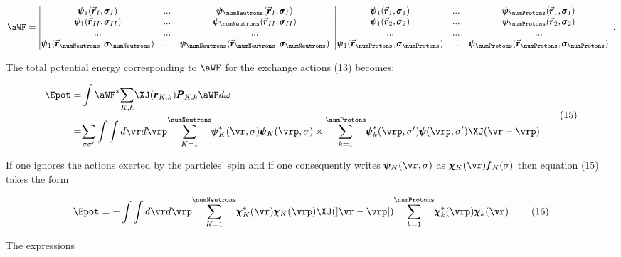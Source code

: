 \documentclass{article}
\newcommand{\var}[1]{\pmb{#1}}
\newcommand{\const}[1]{#1}
\newcommand{\nc}[2]{
  \newcommand{#1}{#2}
}
\newcommand{\rc}[2]{
  \renewcommand{#1}{#2}
}
\newcommand{\comp}[1]{{#1}}
\newcommand{\vect}[1]{\vec{\var{#1}}}
\newcommand{\primed}[1]{{#1^{\prime}}}
\newcommand{\isoX}[1]{\var{\rho}^\comp{#1}}
\newcommand{\vrX}[1]{\vect{r}_{\comp{#1}}}
\newcommand{\spinX}[1]{\var{\sigma}_{\comp{#1}}}
\newcommand{\WF}{\var{\psi}}
\newcommand{\WFxy}[2]{
  \WF_{\comp{#1}}(\vrX{#2}, \spinX{#2})
}
\newcommand{\ser}[2]{\underset{#1}{\sum} #2 }
\newcommand{\serXY}[3]{\underset{#1}{\overset{#2}{\sum}} #3}
\newcommand{\nequ}[2]{
\begin{equation*}
#1
\tag{#2}
\end{equation*}
}
\newcommand{\uequ}[1]{
\begin{equation*}
#1
\end{equation*}
}
\begin{document}
\uequ{
\aWF = \begin{vmatrix}
 \WFxy{1}{I} & ... & \WFxy{\numNeutrons}{I} \\
 \WFxy{1}{II} & ... & \WFxy{\numNeutrons}{II} \\
        ... & ... & ... \\
 \WFxy{1}{\numNeutrons} & ... & \WFxy{\numNeutrons}{\numNeutrons}
\end{vmatrix}\begin{vmatrix}
\WFxy{1}{1} & ... & \WFxy{\numProtons}{1} \\
 \WFxy{1}{2} & ... & \WFxy{\numProtons}{2} \\
        ... & ... & ... \\
 \WFxy{1}{\numProtons} & ... & \WFxy{\numProtons}{\numProtons}
\end{vmatrix}.
}

The total potential energy corresponding to $\aWF$ for the exchange actions (13) becomes:

\newcommand{\opCC}[1]{{#1}^{*}}
\nc{\rKk}{\var{r}_{K,k}}
\nc{\PKk}{\var{P}_{K,k}}
\nc{\sig}{\comp{\sigma}}
\nc{\sigp}{\comp{\primed{\sigma}}}
\newcommand{\chiX}[1]{\var{\chi}_{#1}}
\newcommand{\CCchiX}[1]{\opCC{\var{\chi}}_{#1}}

\nc{\chik}{\chiX{k}}
\nc{\chiK}{\chiX{K}}
\nc{\CCchik}{\CCchiX{k}}
\nc{\CCchiK}{\CCchiX{K}}


\nequ{
\begin{split}
\Epot =& \int{\opCC{\aWF}\ser{K,k}{\XJ(\rKk)\PKk\aWF}d\omega} \\
    =& \ser{\sig\sigp}{
      \int{\int{d\vr d\vrp
        \serXY{K=1}{\numNeutrons}{
          \opCC{\WF}_{K}(\vr, \sig)\WF_{K}(\vrp, \sig)
        }\times\serXY{k=1}{\numProtons}{
         \opCC{\WF}_{k}(\vrp, \sigp)\WF(\vrp,\sigp)\XJ(\vr -\vrp)
        }
      }}
    }
\end{split}
}{15}

If one ignores the actions exerted by the particles' spin and if one consequently writes $\WF_{K}(\vr,\sig)$ as $\chiK(\vr)\var{f}_{K}(\sig)$ then equation (15) takes the form

\nequ{
\Epot = -\int{\int{d\vr d\vrp
  \serXY{K=1}{\numNeutrons}{
    \CCchiK(\vr)\chiK(\vrp)\XJ(|\vr - \vrp|)
  }
  \serXY{k=1}{\numProtons}{
    \CCchik(\vrp)\chik(\vr)
  }
}}.
}{16}

The expressions

\nc{\isoN}{\isoX{N}}
\nc{\isoP}{\isoX{P}}
\nc{\vp}{\vect{p}}
\nc{\vpp}{\primed{\vp}}
\nc{\pN}{\var{p}_{\comp{N}}}
\nc{\pP}{\var{p}_{\comp{P}}}
\nc{\pNr}{\pN(\vr)}
\nc{\pPr}{\pP(\vr)}
\nc{\rhoN}{{{\var{\rho}}_{N}}}
\nc{\rhoP}{{{\var{\rho}}_{P}}}
\nc{\rhoNrrp}{\rhoN(\vr, \vrp)}
\nc{\rhoPrrp}{\rhoP(\vr, \vrp)}
\nc{\midrrp}{\frac{\vr + \vrp}{2}}
\nc{\diffrrp}{\vr - \vrp}
\nc{\vs}{\vect{s}}
\nc{\s}{\var{s}}
\nc{\dvr}{d\vr}
\nc{\dvrp}{d\vrp}
\nc{\dvs}{d\vs}
\nc{\dvp}{d\vp}
\nc{\dvpp}{d\vpp}
\rc{\i}{\const{i}}
\nc{\f}{\var{f}}
\nc{\fivethirds}{{\frac{5}{3}}}
\nc{\cone}{\const{c_1}}
\nc{\ctwo}{\const{c_2}}
\nc{\V}{\const{V}}
\end{document}
